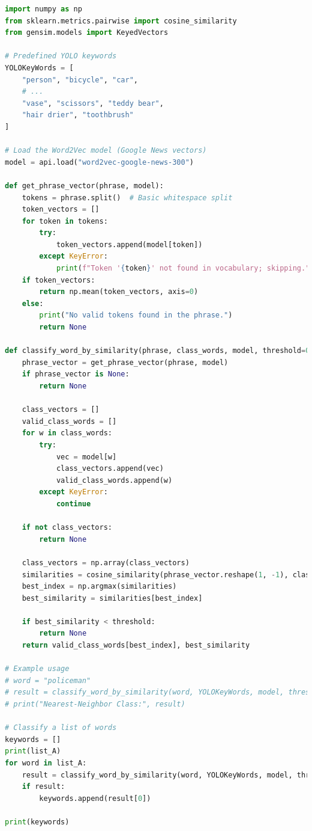 \documentclass[11pt,letterpaper]{article}
\begin{document}
\begin{lstlisting}[language=Python, caption={Code for words match}, label={lst:mask_processing}]
import numpy as np
from sklearn.metrics.pairwise import cosine_similarity
from gensim.models import KeyedVectors

# Predefined YOLO keywords
YOLOKeyWords = [
    "person", "bicycle", "car", 
    # ...
    "vase", "scissors", "teddy bear",
    "hair drier", "toothbrush"
]

# Load the Word2Vec model (Google News vectors)
model = api.load("word2vec-google-news-300")

def get_phrase_vector(phrase, model):
    tokens = phrase.split()  # Basic whitespace split
    token_vectors = []
    for token in tokens:
        try:
            token_vectors.append(model[token])
        except KeyError:
            print(f"Token '{token}' not found in vocabulary; skipping.")
    if token_vectors:
        return np.mean(token_vectors, axis=0)
    else:
        print("No valid tokens found in the phrase.")
        return None

def classify_word_by_similarity(phrase, class_words, model, threshold=0.0):
    phrase_vector = get_phrase_vector(phrase, model)
    if phrase_vector is None:
        return None

    class_vectors = []
    valid_class_words = []
    for w in class_words:
        try:
            vec = model[w]
            class_vectors.append(vec)
            valid_class_words.append(w)
        except KeyError:
            continue
    
    if not class_vectors:
        return None

    class_vectors = np.array(class_vectors)
    similarities = cosine_similarity(phrase_vector.reshape(1, -1), class_vectors).flatten()
    best_index = np.argmax(similarities)
    best_similarity = similarities[best_index]

    if best_similarity < threshold:
        return None
    return valid_class_words[best_index], best_similarity

# Example usage
# word = "policeman"
# result = classify_word_by_similarity(word, YOLOKeyWords, model, threshold=0.3)
# print("Nearest-Neighbor Class:", result)

# Classify a list of words
keywords = []
print(list_A)
for word in list_A:
    result = classify_word_by_similarity(word, YOLOKeyWords, model, threshold=0.3)
    if result:
        keywords.append(result[0])

print(keywords)
\end{lstlisting}
\end{document}
